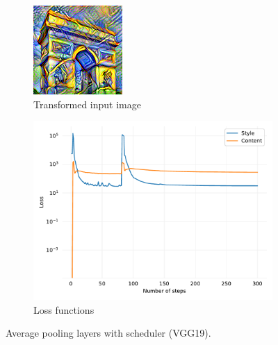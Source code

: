 \documentclass[twocolumn,superscriptaddress,aps,floatfix, nofootinbib]{revtex4-1}
\begin{document}
    \begin{figure}[ht]
        \centering
        \begin{subfigure}[b]{0.22\textwidth}
            \centering
            \includegraphics[width=\textwidth]{resources/png/architecture/sun-trees-paris-avgpool-scheduler.png}
            \caption{Transformed input image}
        \end{subfigure}
        \hfill
        \begin{subfigure}[b]{0.22\textwidth}
            \centering
            \includegraphics[width=\textwidth]{resources/pdf/architecture/sun-trees-paris-avgpool-scheduler.pdf}
            \caption{Loss functions}
        \end{subfigure}
        \caption{Average pooling layers with scheduler (VGG19).}
        \label{fig:model.architecture.loss.scheduler}
    \end{figure}
    
\end{document}
